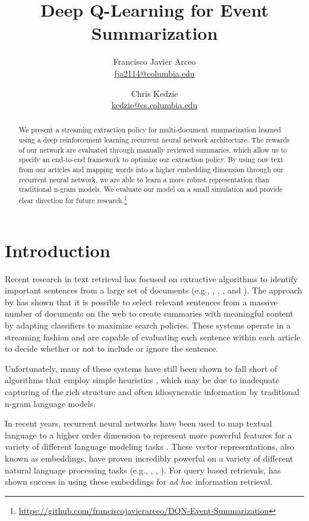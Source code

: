 \documentclass[12pt]{article}
\title{Deep Q-Learning for Event Summarization}
\author{
	Francisco Javier Arceo \\ \href{mailto: fja2114@columbia.edu}{\small fja2114@columbia.edu} 
		\and  
	Chris Kedzie \\ \href{mailto: kedzie@cs.columbia.edu}{\small kedzie@cs.columbia.edu} 
	}
\begin{document}
\maketitle

\begin{abstract}
We present a streaming extraction policy for multi-document summarization learned using a deep reinforcement learning recurrent neural network architecture. The rewards of our network are evaluated through manually reviewed summaries, which allow us to specify an end-to-end framework to optimize our extraction policy.  By using raw text from our articles and mapping words into a higher embedding dimension through our recurrent neural network, we are able to learn a more robust representation than traditional n-gram models. We evaluate our model on a small simulation and provide clear direction for future research.\footnote{ \url{https://github.com/franciscojavierarceo/DQN-Event-Summarization} }
\end{abstract}



\section{Introduction}

Recent research in text retrieval  has focused on extractive algorithms to identify important sentences from a large set of documents (e.g., \cite{diazquery}, \cite{kedzie2015predicting}, \cite{garbacea2015university}, and \cite{kedzieextractive}). The approach by \cite{kedzie2015predicting}  has shown that it is possible to select relevant sentences from a massive number of documents on the web to create summaries with meaningful content by adapting classifiers to maximize search policies. These systems operate in a streaming fashion and are capable of evaluating each sentence within each article to decide whether or not to include or ignore the sentence. 

Unfortunately, many of these systems have still been shown to fall short of algorithms that employ simple heuristics \cite{garbacea2015university}, which may be due to inadequate capturing of the rich structure and often idiosyncratic information by traditional n-gram language models.  

In recent years, recurrent neural networks have been used to map textual language to a higher order dimension to represent more powerful features for a variety of different language modeling tasks \cite{mikolov2010recurrent}. These vector representations, also known as embeddings, have proven incredibly powerful on a variety of different natural language processing tasks (e.g., \cite{bengio2003neural}, \cite{sundermeyer2012lstm}, \cite{kim2016character}). For query based retrievals, \cite{diazquery} has shown success in using these embeddings for \emph{ad hoc} information retrieval.
\end{document}
